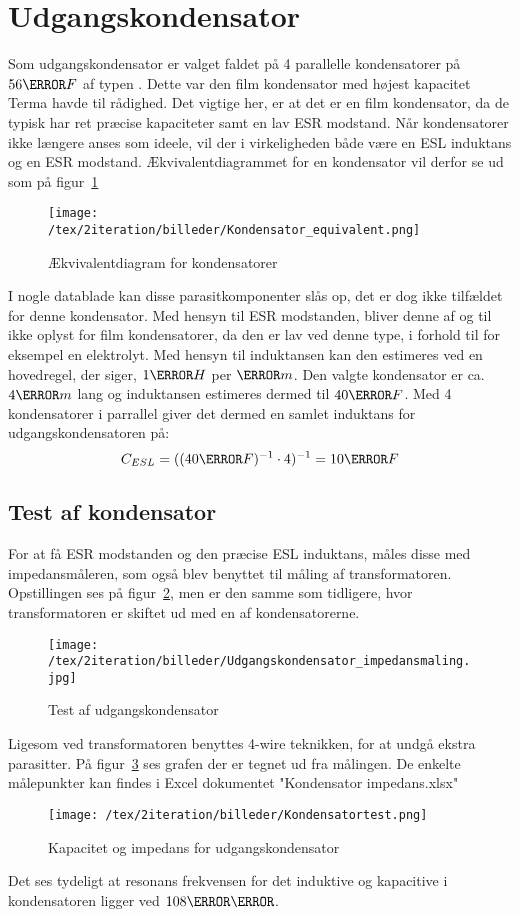 \section{Udgangskondensator} \label{output_cap}
Som udgangskondensator er valget faldet på 4 parallelle kondensatorer på $56\micro F$ af typen . Dette var den film kondensator med højest kapacitet Terma havde til rådighed. Det vigtige her, er at det er en film kondensator, da de typisk har ret præcise kapaciteter samt en lav ESR modstand. Når kondensatorer ikke længere anses som ideele, vil der i virkeligheden både være en ESL induktans og en ESR modstand. Ækvivalentdiagrammet for en kondensator vil derfor se ud som på figur~\ref{fig: con_equi} 
\begin{figure}[H]
	\center
	\texttt{[image: /tex/2iteration/billeder/Kondensator\_equivalent.png]}
	\caption{Ækvivalentdiagram for kondensatorer}
	\label{fig: con_equi}
\end{figure}
I nogle datablade kan disse parasitkomponenter slås op, det er dog ikke tilfældet for denne kondensator. Med hensyn til ESR modstanden, bliver denne af og til ikke oplyst for film kondensatorer, da den er lav ved denne type, i forhold til for eksempel en elektrolyt. 
Med hensyn til induktansen kan den estimeres ved en hovedregel, der siger, $1\nano H$ per $\milli m$\cite[p.~38]{rule_of_thumb}. Den valgte kondensator er ca. $4\centi m$ lang og induktansen estimeres dermed til $40\nano F$. Med 4 kondensatorer i parrallel giver det dermed en samlet induktans for udgangskondensatoren på:
\begin{equation} \label{ESL}
C_{ESL} = ((40\nano F)^{-1} \cdot 4)^{-1} = 10\nano F
\end{equation}

\subsection{Test af kondensator}

For at få ESR modstanden og den præcise ESL induktans, måles disse med impedansmåleren, som også blev benyttet til måling af transformatoren. Opstillingen ses på figur~\ref{fig: cap}, men er den samme som tidligere, hvor transformatoren er skiftet ud med en af kondensatorerne. 
\begin{figure}[H]
	\center
	\texttt{[image: /tex/2iteration/billeder/Udgangskondensator\_impedansmaling.jpg]}
	\caption{Test af udgangskondensator}
	\label{fig: cap}
\end{figure}
Ligesom ved transformatoren benyttes 4-wire teknikken, for at undgå ekstra parasitter. På figur~\ref{fig: captest} ses grafen der er tegnet ud fra målingen. De enkelte målepunkter kan findes i Excel dokumentet "Kondensator impedans.xlsx"
\begin{figure}[H]
	\center
	\texttt{[image: /tex/2iteration/billeder/Kondensatortest.png]}
	\caption{Kapacitet og impedans for udgangskondensator}
	\label{fig: captest}
\end{figure}
Det ses tydeligt at resonans frekvensen for det induktive og kapacitive i kondensatoren ligger ved $108\kilo \hertz$. 


